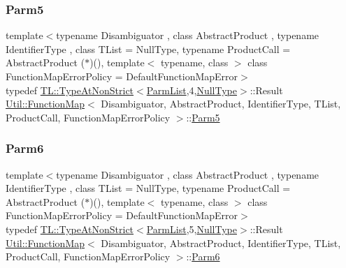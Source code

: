 \subsubsection{\texorpdfstring{Parm5}{Parm5}\hspace{0.1cm}{\footnotesize\ttfamily [3/3]}}
{\footnotesize\ttfamily template$<$typename Disambiguator , class Abstract\+Product , typename Identifier\+Type , class T\+List  = Null\+Type, typename Product\+Call  = Abstract\+Product ($\ast$)(), template$<$ typename, class $>$ class Function\+Map\+Error\+Policy = Default\+Function\+Map\+Error$>$ \\
typedef \mbox{\hyperlink{structUtil_1_1TL_1_1TypeAtNonStrict}{T\+L\+::\+Type\+At\+Non\+Strict}}$<$\mbox{\hyperlink{classUtil_1_1FunctionMap_a6cf0e6766cf6f20642ba61c4994bb477}{Parm\+List}},4,\mbox{\hyperlink{classUtil_1_1NullType}{Null\+Type}}$>$\+::Result \mbox{\hyperlink{classUtil_1_1FunctionMap}{Util\+::\+Function\+Map}}$<$ Disambiguator, Abstract\+Product, Identifier\+Type, T\+List, Product\+Call, Function\+Map\+Error\+Policy $>$\+::\mbox{\hyperlink{classUtil_1_1FunctionMap_a993589d5b721f73c7905377e24dbf9f4}{Parm5}}}

\mbox{\label{classUtil_1_1FunctionMap_ae121f4a5c3534a888db59d6702a15b40}} 
\subsubsection{\texorpdfstring{Parm6}{Parm6}\hspace{0.1cm}{\footnotesize\ttfamily [1/3]}}
{\footnotesize\ttfamily template$<$typename Disambiguator , class Abstract\+Product , typename Identifier\+Type , class T\+List  = Null\+Type, typename Product\+Call  = Abstract\+Product ($\ast$)(), template$<$ typename, class $>$ class Function\+Map\+Error\+Policy = Default\+Function\+Map\+Error$>$ \\
typedef \mbox{\hyperlink{structUtil_1_1TL_1_1TypeAtNonStrict}{T\+L\+::\+Type\+At\+Non\+Strict}}$<$\mbox{\hyperlink{classUtil_1_1FunctionMap_a6cf0e6766cf6f20642ba61c4994bb477}{Parm\+List}},5,\mbox{\hyperlink{classUtil_1_1NullType}{Null\+Type}}$>$\+::Result \mbox{\hyperlink{classUtil_1_1FunctionMap}{Util\+::\+Function\+Map}}$<$ Disambiguator, Abstract\+Product, Identifier\+Type, T\+List, Product\+Call, Function\+Map\+Error\+Policy $>$\+::\mbox{\hyperlink{classUtil_1_1FunctionMap_ae121f4a5c3534a888db59d6702a15b40}{Parm6}}}

